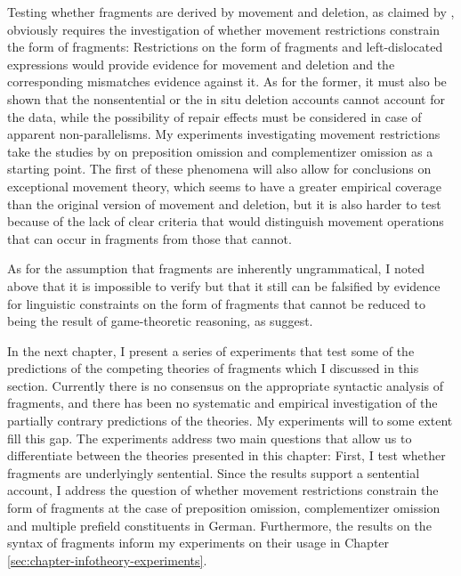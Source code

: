 Testing whether fragments are derived by movement and deletion, as claimed by \citet{merchant2004}, obviously requires the investigation of whether movement restrictions constrain the form of fragments: Restrictions on the form of fragments and left-dislocated expressions would provide evidence for movement and deletion and the corresponding mismatches evidence against it. As for the former, it must also be shown that the nonsentential or the in situ deletion accounts cannot account for the data, while the possibility of repair effects must be considered in case of apparent non-parallelisms. My experiments investigating movement restrictions take the studies by \citet{merchant.etal2013} on preposition omission and complementizer omission as a starting point. The first of these phenomena will also allow for conclusions on  exceptional movement theory, which seems to have a greater empirical coverage than the original version of movement and deletion, but it is also harder to test because of the lack of clear criteria that would distinguish movement operations that can occur in fragments from those that cannot.

As for the assumption that fragments are inherently ungrammatical, I noted above that it is impossible to verify but that it still can be falsified by evidence for linguistic constraints on the form of fragments that cannot be reduced to being the result of game-theoretic reasoning, as \citet{bergen.goodman2015} suggest.

In the next chapter, I present a series of experiments that test some of the predictions of the competing theories of fragments which I discussed in this section. Currently there is no consensus on the appropriate syntactic analysis of fragments, and there has been no systematic and empirical investigation of the partially contrary predictions of the theories. My experiments will to some extent fill this gap. The experiments address two main questions that allow us to differentiate between the theories presented in this chapter: First, I test whether fragments are underlyingly sentential. Since the results support a sentential account, I  address the question of whether movement restrictions constrain the form of fragments at the case of preposition omission, complementizer omission and multiple prefield constituents in German. Furthermore, the results on the syntax of fragments inform my experiments on their usage in Chapter \ref{sec:chapter-infotheory-experiments}.
